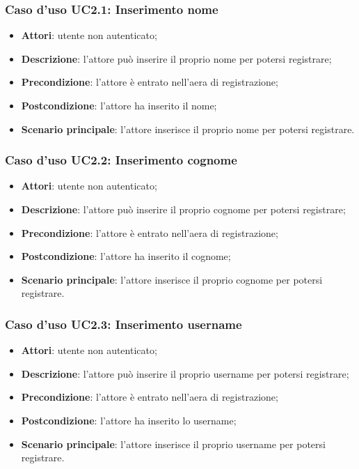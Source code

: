 \subsubsection{Caso d'uso UC2.1: Inserimento nome}
\begin{itemize}
\item \textbf{Attori}: utente non autenticato;
\item \textbf{Descrizione}: l'attore può inserire il proprio nome per potersi registrare;
\item \textbf{Precondizione}: l'attore è entrato nell'aera di registrazione;
\item \textbf{Postcondizione}: l'attore ha inserito il nome;
\item \textbf{Scenario principale}: l'attore inserisce il proprio nome per potersi registrare.
\end{itemize}

\subsubsection{Caso d'uso UC2.2: Inserimento cognome}
\begin{itemize}
\item \textbf{Attori}: utente non autenticato;
\item \textbf{Descrizione}: l'attore può inserire il proprio cognome per potersi registrare;
\item \textbf{Precondizione}: l'attore è entrato nell'aera di registrazione;
\item \textbf{Postcondizione}: l'attore ha inserito il cognome;
\item \textbf{Scenario principale}: l'attore inserisce il proprio cognome per potersi registrare.
\end{itemize}

\subsubsection{Caso d'uso UC2.3: Inserimento username}
\begin{itemize}
\item \textbf{Attori}: utente non autenticato;
\item \textbf{Descrizione}: l'attore può inserire il proprio username per potersi registrare;
\item \textbf{Precondizione}: l'attore è entrato nell'aera di registrazione;
\item \textbf{Postcondizione}: l'attore ha inserito lo username;
\item \textbf{Scenario principale}: l'attore inserisce il proprio username per potersi registrare.
\end{itemize}

